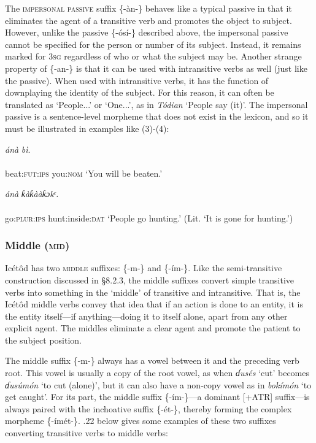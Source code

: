The \textsc{impersonal passive} suffix \{-àn-\} behaves like a typical passive in that it eliminates the agent of a transitive verb and promotes the object to subject. However, unlike the passive \{-ósí-\} described above, the impersonal passive cannot be specified for the person or number of its subject. Instead, it remains marked for 3\textsc{sg} regardless of who or what the subject may be. Another strange property of \{-an-\} is that it can be used with intransitive verbs as well (just like the passive). When used with intransitive verbs, it has the function of downplaying the identity of the subject. For this reason, it can often be translated as ‘People...’ or ‘One...’, as in \textit{Tódian} ‘People say (it)’. The impersonal passive is a sentence-level morpheme that does not exist in the lexicon, and so it must be illustrated in examples like (3)-(4):




\ea\label{ex:}
\textit{án}\textit{à}   \textit{bì}. \\
    \\
beat:\textsc{fut:ips}  you:\textsc{nom}
\glt ‘You will be beaten.’ 
\z




\ea\label{ex:}
\textit{án}\textit{à}   \textit{ƙàƙààƙɔkᵋ.} \\
    \\
go:\textsc{plur:ips} hunt:inside:\textsc{dat}
\glt ‘People go hunting.’ (Lit. ‘It is gone for hunting.’) 
\z




\subsubsection{Middle (\textsc{mid})}

Icétôd has two \textsc{middle} suffixes: \{-m-\} and \{-ím-\}. Like the semi-transitive construction discussed in §8.2.3, the middle suffixes convert simple transitive verbs into something in the ‘middle’ of transitive and intransitive. That is, the Icétôd middle verbs convey that idea that if an action is done to an entity, it is the entity itself—if anything—doing it to itself alone, apart from any other explicit agent. The middles eliminate a clear agent and promote the patient to the subject position. 

The middle suffix \{-m-\} always has a vowel between it and the preceding verb root. This vowel is usually a copy of the root vowel, as when \textit{ɗusés} ‘cut’ becomes \textit{ɗusúmón} ‘to cut (alone)’, but it can also have a non-copy vowel as in \textit{bokímón} ‘to get caught’. For its part, the middle suffix \{-ím-\}—a dominant [+ATR] suffix—is always paired with the inchoative suffix \{-ét-\}, thereby forming the complex morpheme \{-ímét-\}. .22 below gives some examples of these two suffixes converting transitive verbs to middle verbs:


